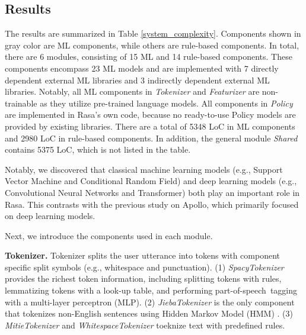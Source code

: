 


\subsection{Results}

The results are summarized in Table \ref{system_complexity}.
Components shown in gray color are ML components, while others are rule-based components. In total,
there are 6 modules, consisting of 15 ML and 14 rule-based components. These components encompass 23 ML models and are implemented with 7 directly dependent external ML libraries and 3 indirectly dependent external ML libraries. Notably, all ML components in \textit{Tokenizer} and \textit{Featurizer} are non-trainable as they utilize pre-trained language models. All components in \textit{Policy} are implemented in Rasa's own code, because no ready-to-use Policy models are provided by existing libraries. There are a total of 5348 LoC in ML components and 2980 LoC in rule-based components. In addition, the general module \textit{Shared} contains 5375 LoC, which is not listed in the table.

Notably, we discovered that classical machine learning models (e.g., Support Vector Machine and Conditional Random Field) and deep learning models (e.g., Convolutional Neural Networks and Transformer) both play an important role in Rasa. This contrasts with the previous study \cite{pengFirstLookIntegration2020} on Apollo, which primarily focused on deep learning models.


Next, we introduce the components used in each module.

\textbf{Tokenizer.} Tokenizer splits the user utterance into tokens with component specific split symbols (e.g., whitespace and punctuation). (1) \textit{SpacyTokenizer} provides the richest token information, including splitting tokens with rules, lemmatizing tokens with a look-up table, and performing part-of-speech~tagging with a multi-layer perceptron (MLP). 
(2) \textit{JiebaTokenizer} is the only component that tokenizes non-English sentences using Hidden Markov Model (HMM) \cite{eddy1996hidden}. (3) \textit{MitieTokenizer} and \textit{WhitespaceTokenizer} toeknize text with predefined rules.


